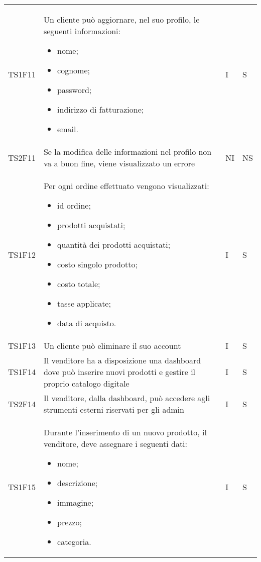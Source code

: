 {\begin{longtable}{C{2cm} C{9.6cm} C{1.5cm} C{1cm}}
TS1F11 & Un cliente può aggiornare, nel suo profilo, le seguenti informazioni:
\begin{itemize}
	\item nome;
	\item cognome;
	\item password;
	\item indirizzo di fatturazione;
	\item email.
\end{itemize}
& I & S\\

TS2F11 & Se la modifica delle informazioni nel profilo non va a buon fine, viene visualizzato un errore & NI & NS\\

TS1F12 & Per ogni ordine effettuato vengono visualizzati:
\begin{itemize}
	\item id ordine;
	\item prodotti acquistati;
	\item quantità dei prodotti acquistati;
	\item costo singolo prodotto;
	\item costo totale;
	\item tasse applicate;
	\item data di acquisto.
\end{itemize}
& I & S\\

TS1F13 & Un cliente può eliminare il suo account & I & S\\

TS1F14 & Il venditore ha a disposizione una dashboard dove può inserire nuovi prodotti e gestire il proprio catalogo digitale & I & S\\

TS2F14 & Il venditore, dalla dashboard, può accedere agli strumenti esterni riservati per gli admin & I & S\\

TS1F15 & Durante l'inserimento di un nuovo prodotto, il venditore, deve assegnare i seguenti dati:
\begin{itemize}
	\item nome;
	\item descrizione;
	\item immagine;
	\item prezzo;
	\item categoria.
\end{itemize} & I & S\\


\end{longtable}}
